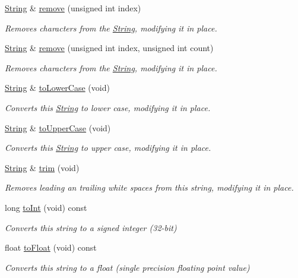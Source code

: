 \begin{DoxyCompactItemize}
\hyperlink{class_string}{String} \& \hyperlink{class_string_a01ab28577facf21ffc183a59983b259e}{remove} (unsigned int index)
\begin{DoxyCompactList}\small\item\em Removes characters from the \hyperlink{class_string}{String}, modifying it in place. \end{DoxyCompactList}\item 
\hyperlink{class_string}{String} \& \hyperlink{class_string_a0c7e2c4875de0d99ad462aeac6da7ef9}{remove} (unsigned int index, unsigned int count)
\begin{DoxyCompactList}\small\item\em Removes characters from the \hyperlink{class_string}{String}, modifying it in place. \end{DoxyCompactList}\item 
\hyperlink{class_string}{String} \& \hyperlink{class_string_a9754260e421ad64409d2fe5817dc243f}{to\+Lower\+Case} (void)
\begin{DoxyCompactList}\small\item\em Converts this \hyperlink{class_string}{String} to lower case, modifying it in place. \end{DoxyCompactList}\item 
\hyperlink{class_string}{String} \& \hyperlink{class_string_a5384fd869d047a68429cbcc6d26d94fa}{to\+Upper\+Case} (void)
\begin{DoxyCompactList}\small\item\em Converts this \hyperlink{class_string}{String} to upper case, modifying it in place. \end{DoxyCompactList}\item 
\hyperlink{class_string}{String} \& \hyperlink{class_string_a7b9ef1226bef45dac72045042afc16e8}{trim} (void)
\begin{DoxyCompactList}\small\item\em Removes leading an trailing white spaces from this string, modifying it in place. \end{DoxyCompactList}\item 
long \hyperlink{class_string_a2dc5a9a787f8ff266d1130594ec65237}{to\+Int} (void) const
\begin{DoxyCompactList}\small\item\em Converts this string to a signed integer (32-\/bit) \end{DoxyCompactList}\item 
float \hyperlink{class_string_ac501497ce1ba7679e80152eaa71c9986}{to\+Float} (void) const
\begin{DoxyCompactList}\small\item\em Converts this string to a float (single precision floating point value) \end{DoxyCompactList}\end{DoxyCompactItemize}
